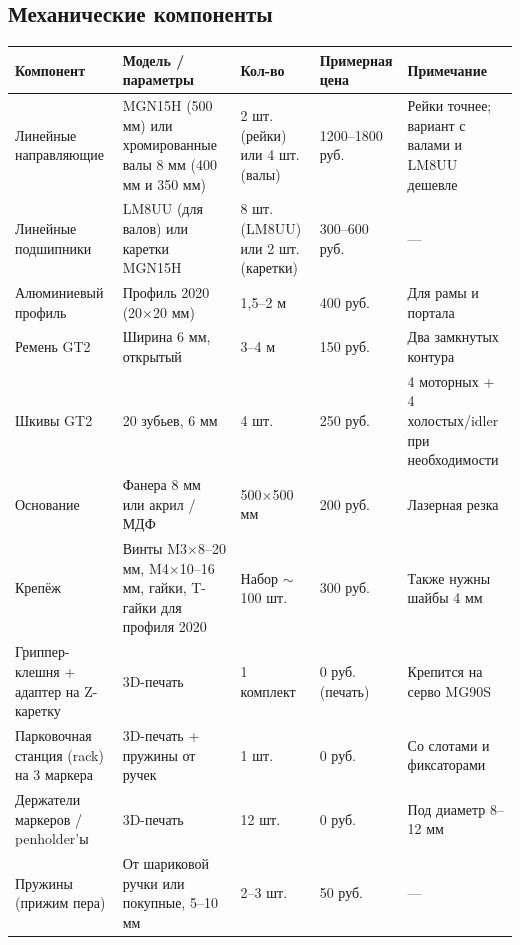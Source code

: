 \documentclass[a4paper,12pt]{article}
\begin{document}
\subsection*{Механические компоненты}

\begin{table}[H]
\centering
\small
\begin{tabularx}{\textwidth}{|p{3.3cm}|Y|p{1.8cm}|p{2.2cm}|Y|}
\hline
\textbf{Компонент} & \textbf{Модель / параметры} & \textbf{Кол-во} & \textbf{Примерная цена} & \textbf{Примечание} \\
\hline
Линейные направляющие & MGN15H (500 мм) \newline или хромированные валы 8 мм (400 мм и 350 мм) & 2 шт. (рейки) \newline или 4 шт. (валы) & 1200--1800 руб. & Рейки точнее; вариант с валами и LM8UU дешевле \\
\hline
Линейные подшипники & LM8UU (для валов) \newline или каретки MGN15H & 8 шт. (LM8UU) \newline или 2 шт. (каретки) & 300--600 руб. & --- \\
\hline
Алюминиевый профиль & Профиль 2020 (20$\times$20 мм) & 1{,}5--2 м & 400 руб. & Для рамы и портала \\
\hline
Ремень GT2 & Ширина 6 мм, открытый & 3--4 м & 150 руб. & Два замкнутых контура \\
\hline
Шкивы GT2 & 20 зубьев, 6 мм & 4 шт. & 250 руб. & 4 моторных + 4 холостых/idler при необходимости \\
\hline
Основание & Фанера 8 мм или акрил / МДФ & 500$\times$500 мм & 200 руб. & Лазерная резка \\
\hline
Крепёж & Винты M3$\times$8--20 мм, M4$\times$10--16 мм, гайки, T-гайки для профиля 2020 & Набор $\sim$100 шт. & 300 руб. & Также нужны шайбы 4 мм \\
\hline
Гриппер-клешня + адаптер на Z-каретку & 3D-печать & 1 комплект & 0 руб. (печать) & Крепится на серво MG90S \\
\hline
Парковочная станция (rack) на 3 маркера & 3D-печать + пружины от ручек & 1 шт. & 0 руб. & Со слотами и фиксаторами \\
\hline
Держатели маркеров / penholder'ы & 3D-печать & 12 шт. & 0 руб. & Под диаметр 8--12 мм \\
\hline
Пружины (прижим пера) & От шариковой ручки или покупные, 5--10 мм & 2--3 шт. & 50 руб. & --- \\
\hline
\end{tabularx}
\end{table}
\end{document}
